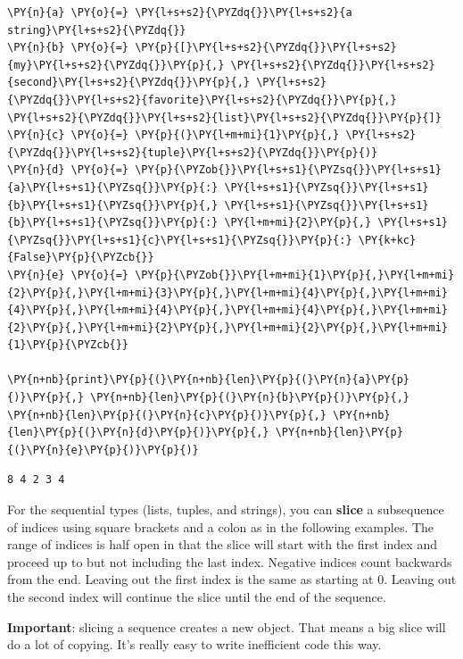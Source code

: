 \begin{Verbatim}[commandchars=\\\{\}]
\PY{n}{a} \PY{o}{=} \PY{l+s+s2}{\PYZdq{}}\PY{l+s+s2}{a string}\PY{l+s+s2}{\PYZdq{}}
\PY{n}{b} \PY{o}{=} \PY{p}{[}\PY{l+s+s2}{\PYZdq{}}\PY{l+s+s2}{my}\PY{l+s+s2}{\PYZdq{}}\PY{p}{,} \PY{l+s+s2}{\PYZdq{}}\PY{l+s+s2}{second}\PY{l+s+s2}{\PYZdq{}}\PY{p}{,} \PY{l+s+s2}{\PYZdq{}}\PY{l+s+s2}{favorite}\PY{l+s+s2}{\PYZdq{}}\PY{p}{,} \PY{l+s+s2}{\PYZdq{}}\PY{l+s+s2}{list}\PY{l+s+s2}{\PYZdq{}}\PY{p}{]}
\PY{n}{c} \PY{o}{=} \PY{p}{(}\PY{l+m+mi}{1}\PY{p}{,} \PY{l+s+s2}{\PYZdq{}}\PY{l+s+s2}{tuple}\PY{l+s+s2}{\PYZdq{}}\PY{p}{)}
\PY{n}{d} \PY{o}{=} \PY{p}{\PYZob{}}\PY{l+s+s1}{\PYZsq{}}\PY{l+s+s1}{a}\PY{l+s+s1}{\PYZsq{}}\PY{p}{:} \PY{l+s+s1}{\PYZsq{}}\PY{l+s+s1}{b}\PY{l+s+s1}{\PYZsq{}}\PY{p}{,} \PY{l+s+s1}{\PYZsq{}}\PY{l+s+s1}{b}\PY{l+s+s1}{\PYZsq{}}\PY{p}{:} \PY{l+m+mi}{2}\PY{p}{,} \PY{l+s+s1}{\PYZsq{}}\PY{l+s+s1}{c}\PY{l+s+s1}{\PYZsq{}}\PY{p}{:} \PY{k+kc}{False}\PY{p}{\PYZcb{}}
\PY{n}{e} \PY{o}{=} \PY{p}{\PYZob{}}\PY{l+m+mi}{1}\PY{p}{,}\PY{l+m+mi}{2}\PY{p}{,}\PY{l+m+mi}{3}\PY{p}{,}\PY{l+m+mi}{4}\PY{p}{,}\PY{l+m+mi}{4}\PY{p}{,}\PY{l+m+mi}{4}\PY{p}{,}\PY{l+m+mi}{4}\PY{p}{,}\PY{l+m+mi}{2}\PY{p}{,}\PY{l+m+mi}{2}\PY{p}{,}\PY{l+m+mi}{2}\PY{p}{,}\PY{l+m+mi}{1}\PY{p}{\PYZcb{}}

\PY{n+nb}{print}\PY{p}{(}\PY{n+nb}{len}\PY{p}{(}\PY{n}{a}\PY{p}{)}\PY{p}{,} \PY{n+nb}{len}\PY{p}{(}\PY{n}{b}\PY{p}{)}\PY{p}{,} \PY{n+nb}{len}\PY{p}{(}\PY{n}{c}\PY{p}{)}\PY{p}{,} \PY{n+nb}{len}\PY{p}{(}\PY{n}{d}\PY{p}{)}\PY{p}{,} \PY{n+nb}{len}\PY{p}{(}\PY{n}{e}\PY{p}{)}\PY{p}{)}
\end{Verbatim}

\begin{Verbatim}
8 4 2 3 4
\end{Verbatim}


For the sequential types (lists, tuples, and strings), you can \textbf{slice} a subsequence of indices using square brackets and a colon as in the following examples.  The range of indices is half open in that the slice will start with the first index and proceed up to but not including the last index.  Negative indices count backwards from the end.  Leaving out the first index is the same as starting at 0.  Leaving out the second index will continue the slice until the end of the sequence.


\textbf{Important}: slicing a sequence creates a new object.  That means a big slice will do a lot of copying.  It's really easy to write inefficient code this way.



